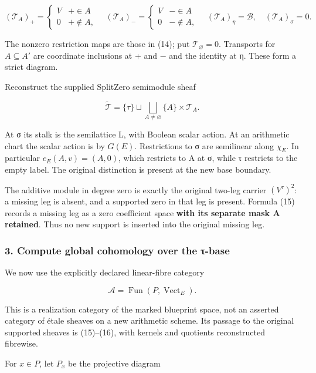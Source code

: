 \[
(\mathcal T_A)_+=\begin{cases}V&+\in A\\0&+\notin A,\end{cases}
\quad
(\mathcal T_A)_-=\begin{cases}V&-\in A\\0&-\notin A,\end{cases}
\quad
(\mathcal T_A)_\eta=\mathscr B,\quad
(\mathcal T_A)_\sigma=0.
\tag{15}
\]

The nonzero restriction maps are those in (14); put \(\mathcal T_\varnothing=0\). Transports for \(A\subseteq A'\) are coordinate inclusions at + and − and the identity at η. These form a strict diagram.

Reconstruct the supplied SplitZero semimodule sheaf

\[
\widetilde{\mathcal T}
=\{\tau\}\sqcup\bigsqcup_{A\ne\varnothing}\{A\}\times\mathcal T_A.
\tag{16}
\]

At σ its stalk is the semilattice L, with Boolean scalar action. At an arithmetic chart the scalar action is by \(G(E)\). Restrictions to σ are semilinear along \(\chi_E\). In particular \(e_E(A,v)=(A,0)\), which restricts to A at σ, while τ restricts to the empty label. The original distinction is present at the new base boundary.

The additive module in degree zero is exactly the original two-leg carrier \((V^\tau)^2\): a missing leg is absent, and a supported zero in that leg is present. Formula (15) records a missing leg as a zero coefficient space \textbf{with its separate mask A retained}. Thus no new support is inserted into the original missing leg.

\subsubsection{3. Compute global cohomology over the τ-base}\label{endpoint-tau_base--compute-global-cohomology-over-the-ux3c4-base}

We now use the explicitly declared linear-fibre category

\[
\mathcal A=\operatorname{Fun}(P,\operatorname{Vect}_E).
\]

This is a realization category of the marked blueprint space, not an asserted category of étale sheaves on a new arithmetic scheme. Its passage to the original supported sheaves is (15)--(16), with kernels and quotients reconstructed fibrewise.

For \(x\in P\), let \(P_x\) be the projective diagram

